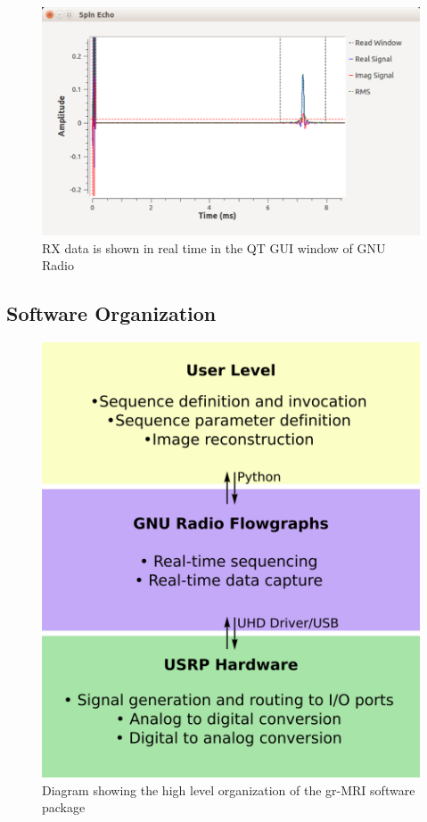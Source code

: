 \documentclass[review]{elsarticle}
\renewcommand{\textcolor}[1]{}
\begin{document}
\begin{figure}[!ht]
\begin{center}
\includegraphics[width = 1\textwidth,trim=0 0 0 0,clip=false]{scan_screenshot.png}
\caption{\textcolor{black}{RX data is shown in real time in the QT GUI window of GNU Radio}}
\label{fig:gui}
\end{center}
\end{figure}

\subsection{Software Organization}\label{Software Organization}

\begin{figure}[ht]
\begin{center}
\includegraphics[width = .5\textwidth,trim=0 0 0 0,clip=false]{overview.png}
\caption{\textcolor{black}{Diagram showing the high level organization of the gr-MRI software package}}
\label{fig:overview}
\end{center}
\end{figure}
\end{document}
